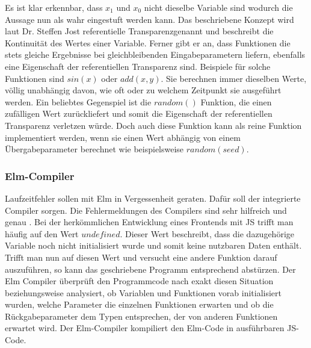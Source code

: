 Es ist klar erkennbar, dass $x_1$ und $x_0$ nicht dieselbe Variable sind wodurch die Aussage nun als wahr eingestuft werden kann. Das beschriebene Konzept wird laut Dr. Steffen Jost \glqq referentielle Transparenz\grqq genannt und beschreibt die Kontinuität des Wertes einer Variable. Ferner gibt er an, dass Funktionen die stets gleiche Ergebnisse bei gleichbleibenden Eingabeparametern liefern, ebenfalls eine Eigenschaft der referentiellen Transparenz sind\cite[Vgl.]{referentielle-transparenz}. Beispiele für solche Funktionen sind $sin(x)$ oder $add(x, y)$. Sie berechnen immer dieselben Werte, völlig unabhängig davon, wie oft oder zu welchem Zeitpunkt sie ausgeführt werden. Ein beliebtes Gegenspiel ist die $random()$ Funktion, die einen zufälligen Wert zurückliefert und somit die Eigenschaft der referentiellen Transparenz verletzen würde. Doch auch diese Funktion kann als reine Funktion implementiert werden, wenn sie einen Wert abhängig von einem Übergabeparameter berechnet wie beispielsweise $random(seed)$.

\subsubsection{Elm-Compiler}
\label{sec:Elm-Compiler}
Laufzeitfehler sollen mit Elm in Vergessenheit geraten. Dafür soll der integrierte Compiler sorgen. Die Fehlermeldungen des Compilers sind sehr hilfreich und genau \cite[Vgl.]{elm-no-runtime-errors}. Bei der herkömmlichen Entwicklung eines Frontends mit \ac{JS} trifft man häufig auf den Wert $undefined$. Dieser Wert beschreibt, dass die dazugehörige Variable noch nicht initialisiert wurde und somit keine nutzbaren Daten enthält. Trifft man nun auf diesen Wert und versucht eine andere Funktion darauf auszuführen, so kann das geschriebene Programm entsprechend abstürzen. Der Elm Compiler überprüft den Programmcode nach exakt diesen Situation beziehungsweise analysiert, ob Variablen und Funktionen vorab initialisiert wurden, welche Parameter die einzelnen Funktionen erwarten und ob die Rückgabeparameter dem Typen entsprechen, der von anderen Funktionen erwartet wird. Der Elm-Compiler kompiliert den Elm-Code in ausführbaren \ac{JS}-Code.


